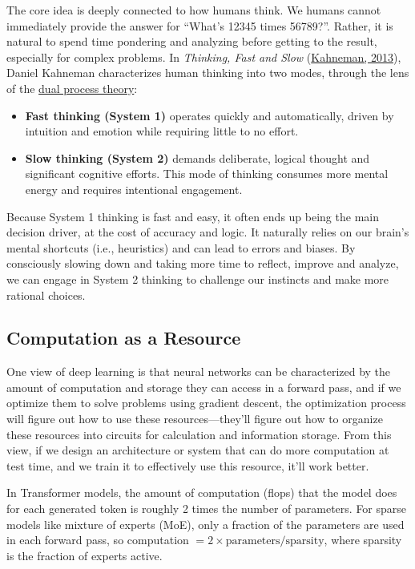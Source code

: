 \documentclass[12pt]{article}
\begin{document}
The core idea is deeply connected to how humans think. We humans cannot immediately provide the answer for ``What's 12345 times 56789?''. Rather, it is natural to spend time pondering and analyzing before getting to the result, especially for complex problems. In \emph{Thinking, Fast and Slow} (\href{https://en.wikipedia.org/wiki/Thinking,_Fast_and_Slow}{Kahneman, 2013}), Daniel Kahneman characterizes human thinking into two modes, through the lens of the \href{https://en.wikipedia.org/wiki/Dual_process_theory}{dual process theory}:

\begin{itemize}
    \item \textbf{Fast thinking (System 1)} operates quickly and automatically, driven by intuition and emotion while requiring little to no effort.
    \item \textbf{Slow thinking (System 2)} demands deliberate, logical thought and significant cognitive efforts. This mode of thinking consumes more mental energy and requires intentional engagement.
\end{itemize}

Because System 1 thinking is fast and easy, it often ends up being the main decision driver, at the cost of accuracy and logic. It naturally relies on our brain’s mental shortcuts (i.e., heuristics) and can lead to errors and biases. By consciously slowing down and taking more time to reflect, improve and analyze, we can engage in System 2 thinking to challenge our instincts and make more rational choices.

\subsection{Computation as a Resource}

One view of deep learning is that neural networks can be characterized by the amount of computation and storage they can access in a forward pass, and if we optimize them to solve problems using gradient descent, the optimization process will figure out how to use these resources---they’ll figure out how to organize these resources into circuits for calculation and information storage. From this view, if we design an architecture or system that can do more computation at test time, and we train it to effectively use this resource, it’ll work better.

In Transformer models, the amount of computation (flops) that the model does for each generated token is roughly 2 times the number of parameters. For sparse models like mixture of experts (MoE), only a fraction of the parameters are used in each forward pass, so computation $= 2 \times \text{parameters} / \text{sparsity}$, where sparsity is the fraction of experts active.
\end{document}
